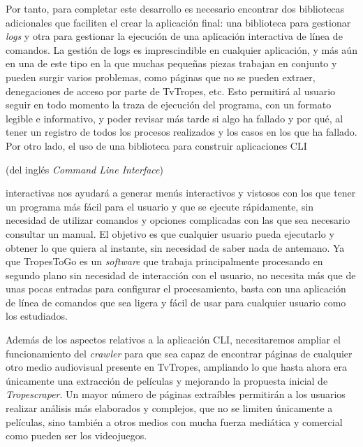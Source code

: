 Por tanto, para completar este desarrollo es necesario encontrar dos bibliotecas
adicionales que faciliten el crear la aplicación final: una biblioteca para
gestionar \textit{logs} y otra para gestionar la ejecución de una aplicación
interactiva de línea de comandos. La gestión de logs es imprescindible en
cualquier aplicación, y más aún en una de este tipo en la que muchas pequeñas
piezas trabajan en conjunto y pueden surgir varios problemas, como páginas que
no se pueden extraer, denegaciones de acceso por parte de TvTropes, etc. Esto
permitirá al usuario seguir en todo momento la traza de ejecución del programa,
con un formato legible e informativo, y poder revisar más tarde si algo ha
fallado y por qué, al tener un registro de todos los procesos realizados y los
casos en los que ha fallado. Por otro lado, el uso de una biblioteca para
construir aplicaciones CLI \begin{otherlanguage}{english}(del inglés
\textit{Command Line Interface})\end{otherlanguage} interactivas nos ayudará a
generar menús interactivos y vistosos con los que tener un programa más fácil para
el usuario y que se ejecute rápidamente, sin necesidad de utilizar comandos y
opciones complicadas con las que sea necesario consultar un manual. El objetivo
es que cualquier usuario pueda ejecutarlo y obtener lo que quiera al instante,
sin necesidad de saber nada de antemano. Ya que TropesToGo es un
\textit{software} que trabaja principalmente procesando en segundo plano sin
necesidad de interacción con el usuario, no necesita más que de unas pocas
entradas para configurar el procesamiento, basta con una aplicación de línea de
comandos que sea ligera y fácil de usar para cualquier usuario como los
estudiados.

Además de los aspectos relativos a la aplicación CLI, necesitaremos ampliar el
funcionamiento del \textit{crawler} para que sea capaz de encontrar páginas de
cualquier otro medio audiovisual presente en TvTropes, ampliando lo que hasta
ahora era únicamente una extracción de películas y mejorando la propuesta
inicial de \textit{Tropescraper}. Un mayor número de páginas extraíbles
permitirán a los usuarios realizar análisis más elaborados y complejos, que no
se limiten únicamente a películas, sino también a otros medios con mucha fuerza
mediática y comercial como pueden ser los videojuegos.

